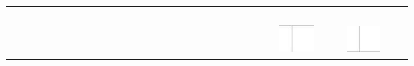\documentclass[10pt]{article}
\begin{document}
\begin{center}
\begin{tabular}{|c|c|c|c|c|c|c|c|c|c|c|c|c|c|c|c|c|c|c|c|c|c|c|c|c|c|c|c|c|c|}
 &  &  \\
\hline
 &  &  &  &  &  &  &  &  &  &  &  &  &  &  &  &  &  &  &  &  &  &  &  &  &  &  &  &  &  \\
\hline
 &  &  &  &  &  &  &  &  &  &  &  &  &  &  &  &  &  &  &  &  &  &  &  &  &  &  &  &  &  \\
\hline
 &  &  &  &  &  &  &  &  &  &  &  &  &  &  &  &  &  &  &  &  &  &  &  &  &  &  &  &  &  \\
\hline
 &  &  &  &  &  &  &  &  &  &  &  &  &  &  &  &  &  &  &  &  &  &  &  &  &  &  &  &  &  \\
\hline
 &  &  &  &  &  &  &  &  &  &  &  &  &  &  &  &  &  &  &  &  &  &  &  & \includegraphics[max width=\textwidth]{2024_11_21_2f72fc0c2faed8928619g-16(2)}
 &  &  & \includegraphics[max width=\textwidth]{2024_11_21_2f72fc0c2faed8928619g-16(1)}

\end{tabular}
\end{center}
\end{document}

